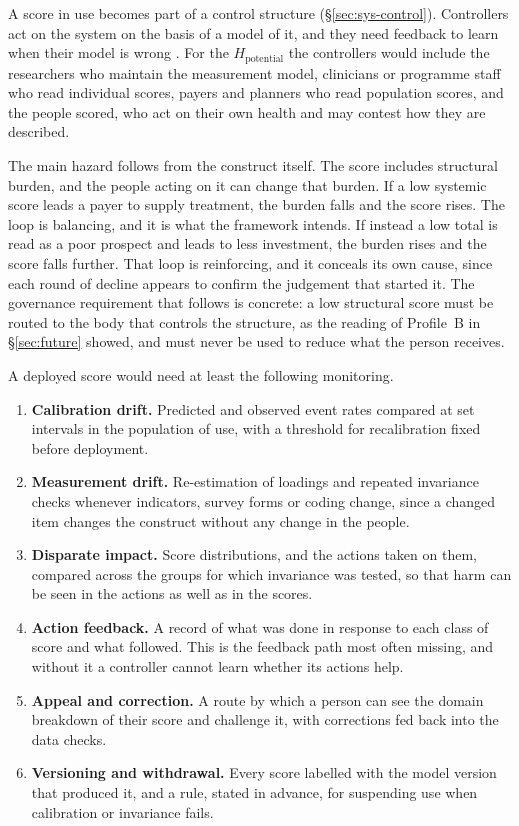 A score in use becomes part of a control structure (\S\ref{sec:sys-control}).
Controllers act on the system on the basis of a model of it, and they need
feedback to learn when their model is wrong \citep{leveson_2011}. For the
$H_{\text{potential}}$ the controllers would include the researchers who
maintain the measurement model, clinicians or programme staff who read
individual scores, payers and planners who read population scores, and the
people scored, who act on their own health and may contest how they are
described.

The main hazard follows from the construct itself. The score includes structural
burden, and the people acting on it can change that burden. If a low systemic
score leads a payer to supply treatment, the burden falls and the score rises.
The loop is balancing, and it is what the framework intends. If instead a low
total is read as a poor prospect and leads to less investment, the burden rises
and the score falls further. That loop is reinforcing, and it conceals its own
cause, since each round of decline appears to confirm the judgement that started
it. The governance requirement that follows is concrete: a low structural score
must be routed to the body that controls the structure, as the reading of
Profile~B in \S\ref{sec:future} showed, and must never be used to reduce what
the person receives.

A deployed score would need at least the following monitoring.

\begin{enumerate}
  \item \textbf{Calibration drift.} Predicted and observed event rates compared
  at set intervals in the population of use, with a threshold for
  recalibration fixed before deployment.
  \item \textbf{Measurement drift.} Re-estimation of loadings and repeated
  invariance checks whenever indicators, survey forms or coding change, since
  a changed item changes the construct without any change in the people.
  \item \textbf{Disparate impact.} Score distributions, and the actions taken
  on them, compared across the groups for which invariance was tested, so that
  harm can be seen in the actions as well as in the scores.
  \item \textbf{Action feedback.} A record of what was done in response to each
  class of score and what followed. This is the feedback path most often
  missing, and without it a controller cannot learn whether its actions help.
  \item \textbf{Appeal and correction.} A route by which a person can see the
  domain breakdown of their score and challenge it, with corrections fed back
  into the data checks.
  \item \textbf{Versioning and withdrawal.} Every score labelled with the model
  version that produced it, and a rule, stated in advance, for suspending use
  when calibration or invariance fails.
\end{enumerate}

